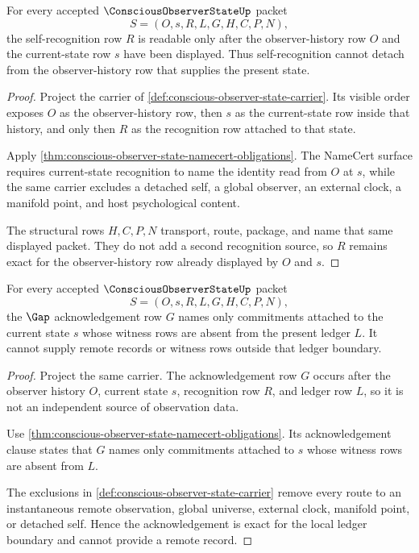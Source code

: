 \begin{theorem}
\label{thm:conscious-observer-state-recognition-exactness}
For every accepted $\ConsciousObserverStateUp$ packet
$$
S=(O,s,R,L,G,H,C,P,N),
$$
the self-recognition row $R$ is readable only after the observer-history row $O$ and the current-state row $s$ have been displayed. Thus self-recognition cannot detach from the observer-history row that supplies the present state.
\end{theorem}
\begin{proof}
Project the carrier of \autoref{def:conscious-observer-state-carrier}. Its visible order exposes $O$ as the observer-history row, then $s$ as the current-state row inside that history, and only then $R$ as the recognition row attached to that state.

Apply \autoref{thm:conscious-observer-state-namecert-obligations}. The NameCert surface requires current-state recognition to name the identity read from $O$ at $s$, while the same carrier excludes a detached self, a global observer, an external clock, a manifold point, and host psychological content.

The structural rows $H,C,P,N$ transport, route, package, and name that same displayed packet. They do not add a second recognition source, so $R$ remains exact for the observer-history row already displayed by $O$ and $s$.
\end{proof}

\begin{theorem}
\label{thm:conscious-observer-state-gap-acknowledgement-exactness}
For every accepted $\ConsciousObserverStateUp$ packet
$$
S=(O,s,R,L,G,H,C,P,N),
$$
the $\Gap$ acknowledgement row $G$ names only commitments attached to the current state $s$ whose witness rows are absent from the present ledger $L$. It cannot supply remote records or witness rows outside that ledger boundary.
\end{theorem}
\begin{proof}
Project the same carrier. The acknowledgement row $G$ occurs after the observer history $O$, current state $s$, recognition row $R$, and ledger row $L$, so it is not an independent source of observation data.

Use \autoref{thm:conscious-observer-state-namecert-obligations}. Its acknowledgement clause states that $G$ names only commitments attached to $s$ whose witness rows are absent from $L$.

The exclusions in \autoref{def:conscious-observer-state-carrier} remove every route to an instantaneous remote observation, global universe, external clock, manifold point, or detached self. Hence the acknowledgement is exact for the local ledger boundary and cannot provide a remote record.
\end{proof}

